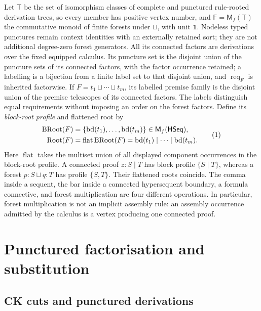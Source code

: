 \documentclass[10pt,a4paper]{article}
\theoremstyle{plain}
\theoremstyle{definition}
\theoremstyle{remark}
\newcommand{\Trees}{\mathsf T}
\newcommand{\Forests}{\mathsf F}
\newcommand{\rootseq}{\operatorname{bd}}
\newcommand{\Root}{\operatorname{Root}}
\newcommand{\BRoot}{\operatorname{BRoot}}
\newcommand{\FlatRoot}{\operatorname{flat}}
\newcommand{\HSeq}{\mathsf{HSeq}}
\newcommand{\fjoin}{\mathbin{\sqcup}}
\newcommand{\one}{\mathbf 1}
\newcommand{\Req}{\operatorname{req}}
\newcommand{\eqtag}{\refstepcounter{equation}\tag{\theequation}}
\begin{document}
Let \(\Trees\) be the set of isomorphism classes of complete and punctured
rule-rooted derivation trees, so every member has positive vertex number, and
\(
 \Forests=\mathsf M_f(\Trees)
\)
the commutative monoid of finite forests under \(\fjoin\), with unit
\(\one\).  Nodeless typed punctures remain context identities with an
externally retained sort; they are not additional degree-zero forest
generators.  All its connected factors are derivations over the fixed
equipped calculus.  Its puncture set is the disjoint
union of the puncture sets of its connected factors, with the factor
occurrence retained; a labelling is a bijection from a finite label set to
that disjoint union, and \(\Req_F\) is inherited factorwise.  If
\(
 F=t_1\fjoin\cdots\fjoin t_m
\),
its labelled premise family is the disjoint union of the premise
telescopes of its connected factors.  The labels distinguish equal
requirements without imposing an order on the forest factors.  Define its
\emph{block-root profile} and flattened root by
\[
\begin{aligned}
 \BRoot(F)&=\{\rootseq(t_1),\ldots,\rootseq(t_m)\}
       \in\mathsf M_f(\HSeq),\\
 \Root(F)&=\FlatRoot\BRoot(F)
       =\rootseq(t_1)\mid\cdots\mid\rootseq(t_m).
\end{aligned}
\eqtag\label{eq:two-root-profiles}
\]
Here \(\FlatRoot\) takes the multiset union of all displayed component
occurrences in the block-root profile.
A connected proof \(z:S\mid T\) has block profile
\(\{S\mid T\}\), whereas a forest \(p:S\fjoin q:T\) has profile
\(\{S,T\}\).  Their flattened roots coincide.  The comma inside a sequent,
the bar inside a connected hypersequent boundary, a formula connective,
and forest multiplication are four different operations.  In particular,
forest multiplication is not an implicit assembly rule: an assembly
occurrence admitted by the calculus is a vertex producing one connected
proof.

\section{Punctured factorisation and substitution}
\label{sec:factorisation}

\subsection{CK cuts and punctured derivations}
\end{document}
